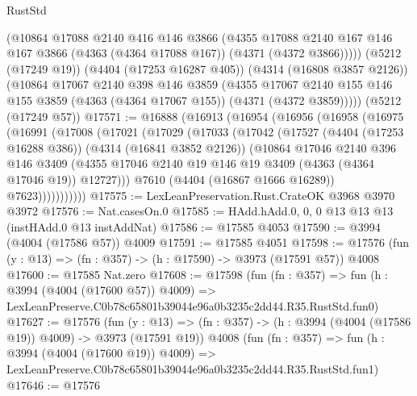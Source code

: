 \begin{lexlean}{RustStd}
\begin{coremodule}
        (@10864
          @17088
          @2140
          @416
          @146
          @3866
          (@4355
            @17088
            @2140
            @167
            @146
            @167
            @3866
            (@4363 (@4364 @17088 @167))
            (@4371 (@4372 @3866)))))
      (@5212 (@17249 @19))
      (@4404 (@17253 @16287 @405))
      (@4314 (@16808 @3857 @2126))
      (@10864
        @17067
        @2140
        @398
        @146
        @3859
        (@4355
          @17067
          @2140
          @155
          @146
          @155
          @3859
          (@4363 (@4364 @17067 @155))
          (@4371 (@4372 @3859)))))
    (@5212 (@17249 @57))
@17571 := @16888
    (@16913
      (@16954
        (@16956
          (@16958
            (@16975
              (@16991
                (@17008
                  (@17021
                    (@17029
                      (@17033
                        (@17042
                          (@17527
                            (@4404 (@17253 @16288 @386))
                            (@4314 (@16841 @3852 @2126))
                            (@10864
                              @17046
                              @2140
                              @396
                              @146
                              @3409
                              (@4355
                                @17046
                                @2140
                                @19
                                @146
                                @19
                                @3409
                                (@4363 (@4364 @17046 @19))
                                @12727)))
                          @7610
                          (@4404 (@16867 @1666 @16289))
                          @7623)))))))))))
@17575 := LexLeanPreservation.Rust.CrateOK @3968 @3970 @3972
@17576 := Nat.casesOn.{0}
@17585 := HAdd.hAdd.{0, 0, 0} @13 @13 @13 (instHAdd.{0} @13 instAddNat)
@17586 := @17585 @4053
@17590 := @3994 (@4004 (@17586 @57)) @4009
@17591 := @17585 @4051
@17598 := @17576 (fun (y : @13) => (fn : @357) -> (h : @17590) -> @3973 (@17591 @57)) @4008
@17600 := @17585 Nat.zero
@17608 := @17598
    (fun (fn : @357) =>
    fun (h : @3994 (@4004 (@17600 @57)) @4009) =>
    LexLeanPreserve.C0b78c65801b39044e96a0b3235c2dd44.R35.RustStd.fun0)
@17627 := @17576
    (fun (y : @13) => (fn : @357) -> (h : @3994 (@4004 (@17586 @19)) @4009) -> @3973 (@17591 @19))
    @4008
    (fun (fn : @357) =>
    fun (h : @3994 (@4004 (@17600 @19)) @4009) =>
    LexLeanPreserve.C0b78c65801b39044e96a0b3235c2dd44.R35.RustStd.fun1)
@17646 := @17576

\end{coremodule}
\end{lexlean}
